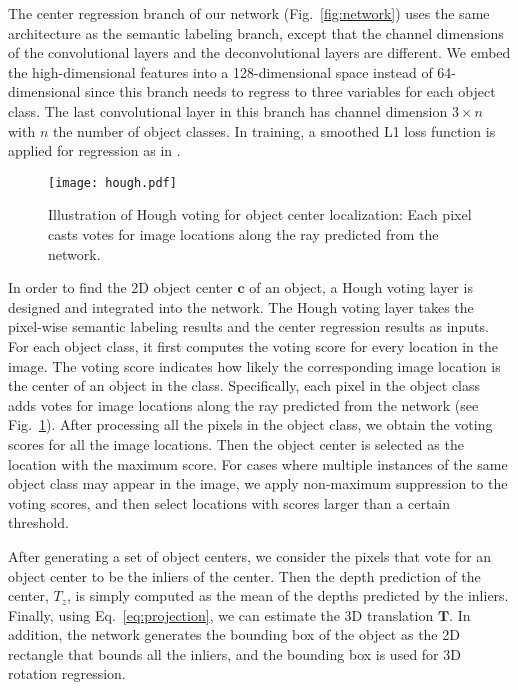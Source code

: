 \documentclass[conference]{IEEEtran}
\begin{document}
The center regression branch of our network (Fig.~\ref{fig:network}) uses the same architecture as the semantic labeling branch, except that the channel dimensions of the convolutional layers and the deconvolutional layers are different. We embed the high-dimensional features into a 128-dimensional space instead of 64-dimensional since this branch needs to regress to three variables for each object class. The last convolutional layer in this branch has channel dimension $3 \times n$ with $n$ the number of object classes. In training, a smoothed L1 loss function is applied for regression as in \cite{girshick2015fast}.

\begin{figure}
	\centering
\texttt{[image: hough.pdf]}
	\caption{Illustration of Hough voting for object center localization: Each pixel casts votes for image locations along the ray predicted from the network.}
	\vspace{-4mm}
	\label{fig:hough}
\end{figure}


In order to find the 2D object center $\mathbf{c}$ of an object, a Hough voting layer is designed and integrated into the network. The Hough voting layer takes the pixel-wise semantic labeling results and the center regression results as inputs. For each object class, it first computes the voting score for every location in the image. The voting score indicates how likely the corresponding image location is the center of an object in the class. Specifically, each pixel in the object class adds votes for image locations along the ray predicted from the network (see Fig.~\ref{fig:hough}). After processing all the pixels in the object class, we obtain the voting scores for all the image locations. Then the object center is selected as the location with the maximum score. For cases where multiple instances of the same object class may appear in the image, we apply non-maximum suppression to the voting scores, and then select locations with scores larger than a certain threshold.

After generating a set of object centers, we consider the pixels that vote for an object center to be the inliers of the center. Then the depth prediction of the center, $T_z$, is simply computed as the mean of the depths predicted by the inliers. Finally, using Eq.~\ref{eq:projection}, we can estimate the 3D translation $\mathbf{T}$. In addition, the network generates the bounding box of the object as the 2D rectangle that bounds all the inliers, and the bounding box is used for 3D rotation regression.
\end{document}

